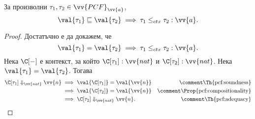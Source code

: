 \begin{framed}
  \begin{theorem}
    За произволни $\tau_1, \tau_2 \in \vv{PCF}_{\vv{a}}$,
    \[\val{\tau_1} \sqsubseteq \val{\tau_2} \implies \tau_1 \leq_{ctx} \tau_2 : \vv{a}.\]
  \end{theorem}  
\end{framed}
\begin{proof}
  Достатъчно е да докажем, че
  \[\val{\tau_1} = \val{\tau_2} \implies \tau_1 \leq_{ctx} \tau_2 : \vv{a}.\]
  Нека $\C[-]$ е контекст, за който $\C[\tau_1] : \vv{nat}$ и $\C[\tau_2] : \vv{nat}$.
  Нека $\val{\tau_1} = \val{\tau_2}$. Тогава
  \begin{align*}
    \C[\tau_1] \Downarrow_{\vv{nat}} \vv{n} & \implies \val{\C[\tau_1]} = \val{\vv{n}} & \comment\text{\Th{pcf:soundness}}\\
                                            & \implies \val{\C[\tau_2]} = \val{\vv{n}} & \comment\text{\Prop{pcf:compositionality}}\\
                                            & \implies \C[\tau_2] \Downarrow_{\vv{nat}} \vv{n}. & \comment\text{\Th{pcf:adequacy}}
  \end{align*}
\end{proof}


